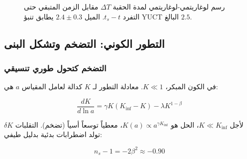 \documentclass[11pt,a4paper]{article}
\begin{document}
	\begin{figure}[htbp]
		\begin{otherlanguage}{english}
			\centering
		\end{otherlanguage}
		\caption{رسم لوغاريتمي-لوغاريتمي لمدة الحقبة \(\Delta T\) مقابل الزمن المتبقي حتى التفرد \(t_s - t\). الميل \(2.4 \pm 0.3\) يطابق تنبؤ YUCT البالغ \(2.5\).}
		\label{fig:paleo-scaling}
	\end{figure}
	
	\subsection{التطور الكوني: التضخم وتشكل البنى}
	\label{subsec:cosmo}
	
	\subsubsection{التضخم كتحول طوري تنسيقي}
	
	في الكون المبكر، \(K \ll 1\). معادلة التطور لـ \(K\) كدالة لعامل المقياس \(a\) هي:
	
	\begin{equation}
		\frac{dK}{d\ln a} = \gamma K (K_{\text{inf}} - K) - \lambda K^{1-\beta}
		\label{eq:cosmo-evolution}
	\end{equation}
	
	لأجل \(K \ll K_{\text{inf}}\)، الحل هو \(K(a) \propto a^{\gamma K_{\text{inf}}}\)، معطياً توسعاً أسياً (تضخم). التقلبات \(\delta K\) تولد اضطرابات بدئية بدليل طيفي:
	
	\begin{equation}
		n_s - 1 = -2\beta^2 \approx -0.90
		\label{eq:ns-wrong}
	\end{equation}
	
\end{document}
